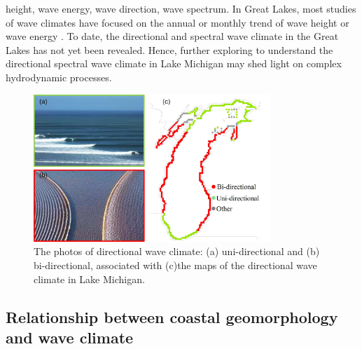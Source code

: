 height, wave energy, wave direction, wave spectrum. In Great Lakes, most studies of wave climates have focused on the annual or monthly trend of wave height \citep[\eg][]{olsen_long_2019,huang_impacts_2021,huang_wave_2021} or wave energy \citep[\eg][]{meadows_relationship_1997}. To date, the directional and spectral wave climate in the Great Lakes has not yet been revealed. Hence, further exploring to understand the directional spectral wave climate in Lake Michigan may shed light on complex hydrodynamic processes.

\begin{figure}[htbp]
  \centering
  \includegraphics[width=0.8\textwidth]{chapter1/resources/figure1-4.jpg}
  \caption{The photos of directional wave climate: (a) uni-directional and (b) bi-directional, associated with (c)the maps of the directional wave climate in Lake Michigan.}
  \label{fig:fig1.4}
\end{figure}

\subsection{Relationship between coastal geomorphology and wave climate}
\label{Relationship between coastal geomorphology and wave climate}

